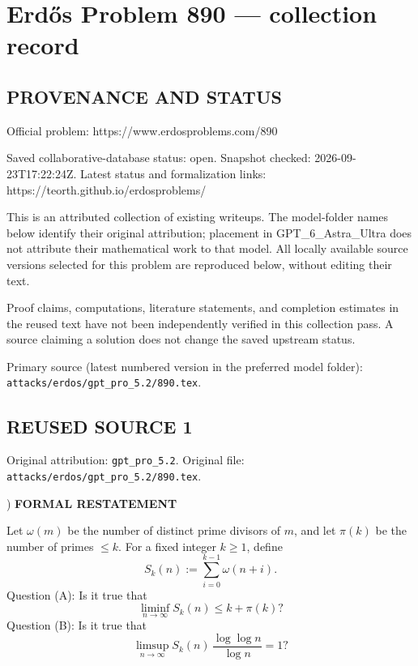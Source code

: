 \section*{Erd\H{o}s Problem 890 --- collection record}

\subsection*{PROVENANCE AND STATUS}
Official problem: https://www.erdosproblems.com/890

Saved collaborative-database status: open.
Snapshot checked: 2026-09-23T17:22:24Z.
Latest status and formalization links: https://teorth.github.io/erdosproblems/

This is an attributed collection of existing writeups. The model-folder names below identify their original attribution; placement in GPT\_6\_Astra\_Ultra does not attribute their mathematical work to that model. All locally available source versions selected for this problem are reproduced below, without editing their text.

Proof claims, computations, literature statements, and completion estimates in the reused text have not been independently verified in this collection pass. A source claiming a solution does not change the saved upstream status.

Primary source (latest numbered version in the preferred model folder): \texttt{attacks/erdos/gpt\_pro\_5.2/890.tex}.

\subsection*{REUSED SOURCE 1}
Original attribution: \texttt{gpt\_pro\_5.2}.
Original file: \texttt{attacks/erdos/gpt\_pro\_5.2/890.tex}.


) \textbf{FORMAL RESTATEMENT}

\noindent Let $\omega(m)$ be the number of distinct prime divisors of $m$, and let $\pi(k)$ be the number of primes $\le k$.
For a fixed integer $k\ge 1$, define
\[
S_k(n) := \sum_{i=0}^{k-1} \omega(n+i).
\]
Question (A): Is it true that
\[
\liminf_{n\to\infty} S_k(n) \le k + \pi(k) ?
\]
Question (B): Is it true that
\[
\limsup_{n\to\infty} S_k(n)\,\frac{\log\log n}{\log n} = 1?
\]


